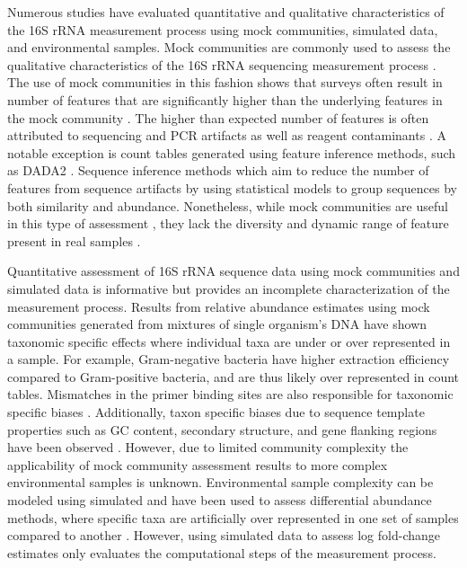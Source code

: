 \documentclass{bmcart}
\begin{document}
Numerous studies have evaluated quantitative and qualitative
characteristics of the 16S rRNA measurement process using mock
communities, simulated data, and environmental samples.
Mock communities are commonly used to assess the qualitative
characteristics of the 16S rRNA sequencing measurement process
\cite{bokulich2016mockrobiota}. The use of mock communities
in this fashion shows that surveys often result in number of features that are significantly higher 
than the underlying features in the mock community
\cite{Kopylova2014}. The higher than expected number of features is
often attributed to sequencing and PCR artifacts as well as reagent
contaminants \cite{brooks2015truth, Huse2010}. 
A notable exception is count tables generated using feature inference methods, such as DADA2 \cite{callahan2016dada2}. Sequence inference methods which aim to reduce the number of features from sequence artifacts by using statistical models to group sequences by both similarity and abundance.
Nonetheless, while mock communities are useful in this type of assessment , they lack the diversity and dynamic range of feature present in real samples \cite{bokulich2016mockrobiota}.

Quantitative assessment of 16S rRNA sequence data using mock communities and
simulated data is informative but provides an
incomplete characterization of the measurement process.
Results from relative abundance estimates using mock communities generated from
mixtures of single organism's DNA have shown taxonomic specific effects
where individual taxa are under or over represented in a sample. For
example, Gram-negative bacteria have higher extraction efficiency
compared to Gram-positive bacteria, and are thus likely over represented
in count tables\cite{Costea2017, Olson2012}.
Mismatches in the primer binding sites are also responsible for
taxonomic specific biases
\cite{brooks2015truth, klindworth2012evaluation, Gohl2016}.
Additionally, taxon specific biases due to sequence template properties
such as GC content, secondary structure, and gene flanking regions have
been observed \cite{Pinto2012, Hansen1998, Gohl2016}.
However, due to limited community complexity the applicability of
mock community assessment results to more complex environmental samples is unknown. 
Environmental sample complexity can be modeled using simulated and have been used to assess differential abundance methods, where specific taxa are
artificially over represented in one set of samples compared to another
\cite{McMurdie2014}. 
However, using simulated data to assess log fold-change
estimates only evaluates the computational steps of the measurement process.
\end{document}
